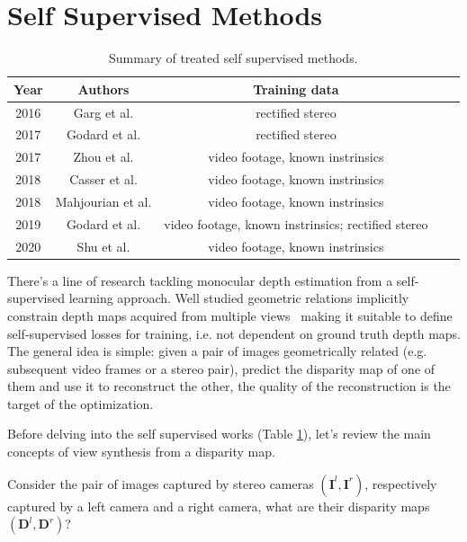 \section{Self Supervised Methods}
\label{s:ssl}


\begin{table}
	\centering
	\begin{tabular}{| c | c | c | c | c |}
	\hline
	\textbf{Year} & \textbf{Authors} & \textbf{Training data} \\
	\hline
	2016 & Garg et al. \cite{Garg} & rectified stereo\\
	2017 & Godard et al. \cite{MonoDepth} & rectified stereo\\
	2017 & Zhou et al. \cite{SfMLearner} & video footage, known instrinsics\\
	2018 & Casser et al. \cite{struct2depth} & video footage, known instrinsics\\
	2018 & Mahjourian et al. \cite{vid2depth} & video footage, known instrinsics\\
	2019 & Godard et al. \cite{MonoDepth2} & video footage, known instrinsics; rectified stereo\\
	2020 & Shu et al. \cite{FeatDepth} & video footage, known instrinsics\\
	\hline
	\end{tabular}
\caption{Summary of treated self supervised methods. \label{table:3}}
\end{table}

There's a line of research tackling monocular depth estimation from a self-supervised learning approach.
Well studied geometric relations implicitly constrain depth maps acquired from multiple views~\cite{multiview} making it suitable to define self-supervised losses for training, i.e. not dependent on ground truth depth maps.
The general idea is simple: given a pair of images geometrically related (e.g. subsequent video frames or a stereo pair), predict the disparity map of one of them and use it to reconstruct the other, the quality of the reconstruction is the target of the optimization.

Before delving into the self supervised works (Table \ref{table:3}), let's review the main concepts of view synthesis from a disparity map.

Consider the pair of images captured by stereo cameras $(\mathbf{I}^{l}, \mathbf{I}^{r})$, respectively captured by a left camera and a right camera, what are their disparity maps $(\mathbf{D}^{l}, \mathbf{D}^{r})$?

